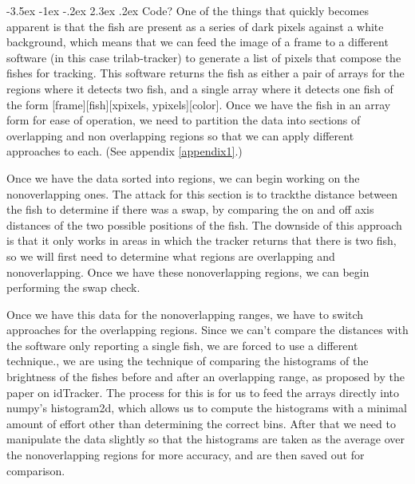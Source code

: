 \documentclass{article}
\makeatletter
\renewcommand\section{\clearpage\newpage\@startsection {section}{1}{\z@}%
	{-3.5ex \@plus -1ex \@minus -.2ex}%
	{2.3ex \@plus.2ex}%
	{\normalfont\Large\bfseries}}
\makeatother
\begin{document}
\section{Code?}
One of the things that quickly becomes apparent is that the fish are present as a series of dark pixels against a white background, which means that we can feed the image of a frame to a different software (in this case trilab-tracker) to generate a list of pixels that compose the fishes for tracking. This software returns the fish as either a pair of arrays for the regions where it detects two fish, and a single array where it detects one fish of the form [frame][fish][xpixels, ypixels][color]. Once we have the fish in an array form for ease of operation, we need to partition the data into sections of overlapping and non overlapping regions so that we can apply different approaches to each. (See appendix \ref{appendix1}.)

Once we have the data sorted into regions, we can begin working on the nonoverlapping ones. The attack for this section is to trackthe distance between the fish to determine if there was a swap, by comparing the on and off axis distances of the two possible positions of the fish. The downside of this approach is that it only works in areas in which the tracker returns that there is two fish, so we will first need to determine what regions are overlapping and nonoverlapping. Once we have these nonoverlapping regions, we can begin performing the swap check. 




Once we have this data for the nonoverlapping ranges, we have to switch approaches for the overlapping regions. Since we can't compare the distances with the software only reporting a single fish, we are forced to use a different technique., we are using the technique of comparing the histograms of the brightness of the fishes before and after an overlapping range, as proposed by the paper on idTracker\cite{idTracker}. The process for this is for us to feed the arrays directly into numpy's histogram2d, which allows us to compute the histograms with a minimal amount of effort other than determining the correct bins. After that we need to manipulate the data slightly so that the histograms are taken as the average over the nonoverlapping regions for more accuracy, and are then saved out for comparison.
\end{document}
